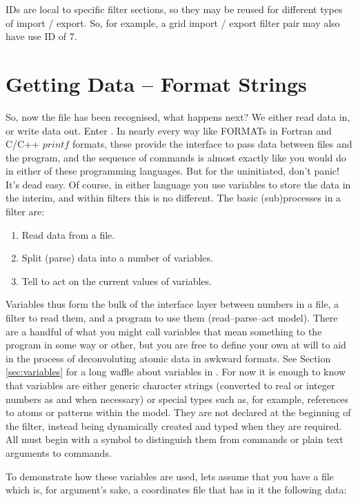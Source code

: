IDs are local to specific filter sections, so they may be reused for different types of import / export. So, for example, a grid import / export filter pair may also have use ID of 7.

\section{Getting Data -- Format Strings}
So, now the file has been recognised, what happens next? We either read data in, or write data out. Enter . In nearly every way like FORMATs in Fortran and C/C++ $printf$ formats, these provide the interface to pass data between files and the program, and the sequence of commands is almost exactly like you would do in either of these programming languages. But for the uninitiated, don't panic! It's dead easy. Of course, in either language you use variables to store the data in the interim, and within filters this is no different. The basic (sub)processes in a filter are:

\begin{enumerate}
	\item Read data from a file.
	\item Split (parse) data into a number of variables.
	\item Tell \progname{} to act on the current values of variables.
\end{enumerate}

Variables thus form the bulk of the interface layer between numbers in a file, a filter to read them, and a program to use them (read--parse--act model). There are a handful of what you might call  variables that mean something to the program in some way or other, but you are free to define your own at will to aid in the process of deconvoluting atomic data in awkward formats. See Section \ref{sec:variables} for a long waffle about variables in \progname{}. For now it is enough to know that variables are either generic character strings (converted to real or integer numbers as and when necessary) or special types such as, for example, references to atoms or patterns within the model. They are not declared at the beginning of the filter, instead being dynamically created and typed when they are required. All must begin with a \qte{\$} symbol to distinguish them from commands or plain text arguments to commands.

To demonstrate how these variables are used, lets assume that you have a file which is, for argument's sake, a coordinates file that has in it the following data:

